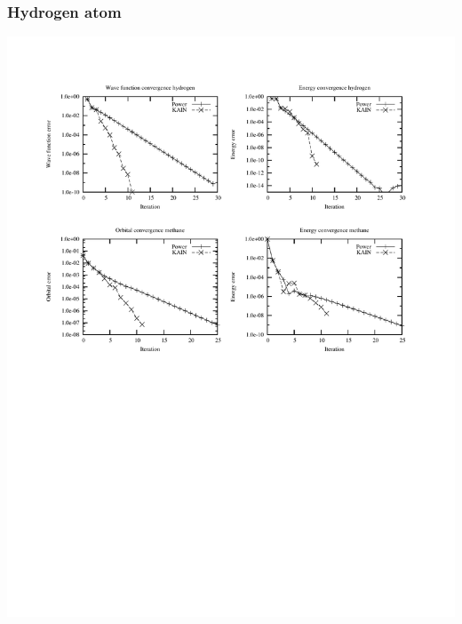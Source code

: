 \documentclass[mathserif]{beamer}
\begin{document}
\begin{frame}
    \frametitle{Hydrogen atom}
    \begin{center}
	\includegraphics[scale=0.6, clip, viewport = 50 550 540 730]{figures/convergence.pdf}
    \end{center}
\end{frame}
\end{document}
